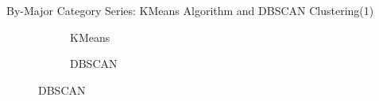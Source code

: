 \documentclass[12pt]{beamer}
\begin{document}
        \begin{frame}{By-Major Category Series: KMeans Algorithm and DBSCAN Clustering(1)}
            \begin{figure}
                \centering
                \begin{subfigure}{0.30\textwidth}
                    \caption{KMeans}
                \end{subfigure}
                \begin{subfigure}{0.30\textwidth}
                    \caption{DBSCAN}
                \end{subfigure}
            \end{figure}
        \end{frame}
\end{document}
